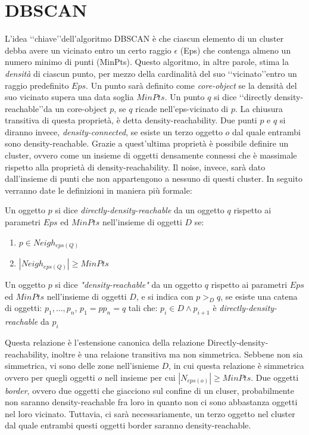
\section{DBSCAN}
L'idea \lq\lq chiave\rq\rq dell'algoritmo DBSCAN\cite{Ester96adensity} è che ciascun elemento di un cluster debba avere un vicinato entro un certo raggio $\epsilon$ (Eps)  che contenga almeno un numero minimo di punti (MinPts). Questo algoritmo, in altre parole, stima la \emph{densità} di ciascun punto, per mezzo della cardinalità del suo \lq\lq vicinato\rq\rq entro un raggio predefinito $Eps$. Un punto sarà definito come \emph{core-object} se la densità del suo vicinato supera una data soglia $MinPts$.
Un punto $q$ si dice \lq\lq directly density-reachable\rq\rq  da un core-object $p$, se $q$ ricade nell'eps-vicinato di $p$.
La chiusura transitiva  di questa proprietà, è detta density-reachability. Due punti $p$ e $q$ si diranno invece, \emph{density-connected}, se esiste un terzo oggetto $o$ dal quale entrambi sono density-reachable. Grazie a quest'ultima proprietà è possibile definire un cluster, ovvero come un insieme di oggetti densamente connessi che è massimale rispetto alla proprietà di density-reachability. Il noise, invece, sarà dato dall'insieme di punti che non appartengono a nessuno di questi cluster.  In seguito verranno date le definizioni in maniera più formale:
\begin{definizione}
\label{def:ddr}
Un oggetto $p$ si dice 	\emph{directly-density-reachable} da un oggetto $q$ rispetto ai parametri $Eps$ ed $MinPts$ nell'insieme di oggetti $D$ se:
\begin{enumerate}
\item $p \in Neigh_{eps(Q)}$
\item $|Neigh_{eps(Q)}| \ge MinPts$
\end{enumerate}
\end{definizione}
\begin{definizione}
\label{def:dr} 
Un oggetto   $p$ si dice 	\emph{"density-reachable"} da un oggetto $q$ rispetto ai parametri $Eps$ ed $MinPts$ nell'insieme di oggetti $D$, e si  indica con \emph{$p>_{D}q$}, se esiste una catena di oggetti: $p_1,\dots,p_n$, $p_1=p p_n=q$ tali che:  $p_{i} \in D  \land p_{i+1}$ è \emph{directly-density-reachable} da $p_{i}$
\end{definizione}
Questa relazione è l'estensione canonica della relazione Directly-density-reachability, inoltre è una relaione transitiva ma non simmetrica. Sebbene non sia simmetrica, vi sono delle zone nell'isnieme $D$, in cui questa relazione è simmetrica ovvero  per quegli oggetti $o$ nell insieme per cui $|N_{eps(o)}| \ge MinPts$. Due oggetti \emph{border}, ovvero due oggetti che giacciono sul confine di un cluser, probabilmente non saranno density-reachable fra loro in quanto non ci sono abbastanza oggetti nel loro vicinato. Tuttavia, ci sarà necessariamente, un terzo oggetto nel cluster dal quale entrambi questi  oggetti border saranno density-reachable.
